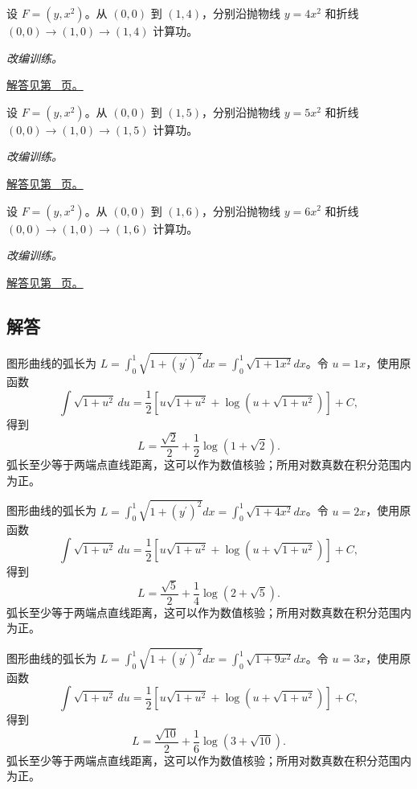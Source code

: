 \documentclass[UTF8,12pt,a4paper,fontset=fandol]{ctexart}
\begin{document}
\begin{example}[两条路径给出不同功]\label{ex:c42q22}
设 $F=(y,x^2)$。从 $(0,0)$ 到 $(1,4)$，分别沿抛物线 $y=4x^2$ 和折线 $(0,0)\to(1,0)\to(1,4)$ 计算功。
\par\textit{改编训练。}\par\hyperref[ans:c42q22]{解答见第~\pageref{ans:c42q22} 页。}
\end{example}
\begin{example}[两条路径给出不同功]\label{ex:c42q23}
设 $F=(y,x^2)$。从 $(0,0)$ 到 $(1,5)$，分别沿抛物线 $y=5x^2$ 和折线 $(0,0)\to(1,0)\to(1,5)$ 计算功。
\par\textit{改编训练。}\par\hyperref[ans:c42q23]{解答见第~\pageref{ans:c42q23} 页。}
\end{example}
\begin{example}[两条路径给出不同功]\label{ex:c42q24}
设 $F=(y,x^2)$。从 $(0,0)$ 到 $(1,6)$，分别沿抛物线 $y=6x^2$ 和折线 $(0,0)\to(1,0)\to(1,6)$ 计算功。
\par\textit{改编训练。}\par\hyperref[ans:c42q24]{解答见第~\pageref{ans:c42q24} 页。}
\end{example}
\subsection{解答}
\begin{solve}\label{ans:c42q1}
图形曲线的弧长为 $L=\int_0^1\sqrt{1+(y^{\prime})^2}dx=\int_0^1\sqrt{1+1x^2}dx$。令 $u=1x$，使用原函数
\[
\int\sqrt{1+u^2}\,du=\frac12\left[u\sqrt{1+u^2}+\log(u+\sqrt{1+u^2})\right]+C,
\]
得到
\[
L=\frac{\sqrt{2}}2+\frac{1}{2}\log(1+\sqrt{2}).
\]
弧长至少等于两端点直线距离，这可以作为数值核验；所用对数真数在积分范围内为正。
\end{solve}

\begin{solve}\label{ans:c42q2}
图形曲线的弧长为 $L=\int_0^1\sqrt{1+(y^{\prime})^2}dx=\int_0^1\sqrt{1+4x^2}dx$。令 $u=2x$，使用原函数
\[
\int\sqrt{1+u^2}\,du=\frac12\left[u\sqrt{1+u^2}+\log(u+\sqrt{1+u^2})\right]+C,
\]
得到
\[
L=\frac{\sqrt{5}}2+\frac{1}{4}\log(2+\sqrt{5}).
\]
弧长至少等于两端点直线距离，这可以作为数值核验；所用对数真数在积分范围内为正。
\end{solve}

\begin{solve}\label{ans:c42q3}
图形曲线的弧长为 $L=\int_0^1\sqrt{1+(y^{\prime})^2}dx=\int_0^1\sqrt{1+9x^2}dx$。令 $u=3x$，使用原函数
\[
\int\sqrt{1+u^2}\,du=\frac12\left[u\sqrt{1+u^2}+\log(u+\sqrt{1+u^2})\right]+C,
\]
得到
\[
L=\frac{\sqrt{10}}2+\frac{1}{6}\log(3+\sqrt{10}).
\]
弧长至少等于两端点直线距离，这可以作为数值核验；所用对数真数在积分范围内为正。
\end{solve}
\end{document}
